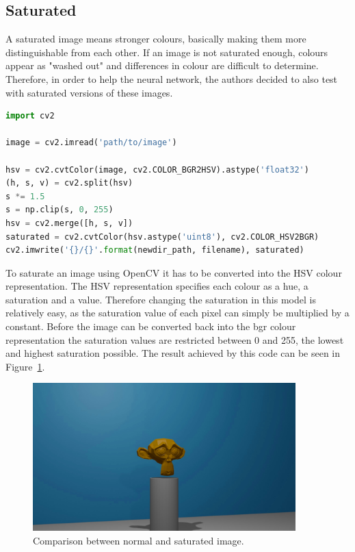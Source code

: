 \subsection{Saturated}
A saturated image means stronger colours, basically making them more distinguishable from each other. If an image is not saturated enough, colours appear as "washed out" and differences in colour are difficult to determine. Therefore, in order to help the neural network, the authors decided to also test with saturated versions of these images.

\begin{lstlisting}[language=python]
import cv2

image = cv2.imread('path/to/image')

hsv = cv2.cvtColor(image, cv2.COLOR_BGR2HSV).astype('float32')
(h, s, v) = cv2.split(hsv)
s *= 1.5
s = np.clip(s, 0, 255)
hsv = cv2.merge([h, s, v])
saturated = cv2.cvtColor(hsv.astype('uint8'), cv2.COLOR_HSV2BGR)
cv2.imwrite('{}/{}'.format(newdir_path, filename), saturated)
\end{lstlisting}

To saturate an image using OpenCV it has to be converted into the HSV colour representation. The HSV representation specifies each colour as a hue, a saturation and a value. Therefore changing the saturation in this model is relatively easy, as the saturation value of each pixel can simply be multiplied by a constant. Before the image can be converted back into the bgr colour representation the saturation values are restricted between 0 and 255, the lowest and highest saturation possible. The result achieved by this code can be seen in Figure~\ref{pic:implementation_opencv_saturated}.

\begin{figure}[h!]
	\centering
	\includegraphics[width=4in]{img/implementation_opencv_saturated.jpg}
	\caption{Comparison between normal and saturated image.}
	\label{pic:implementation_opencv_saturated}
\end{figure}

